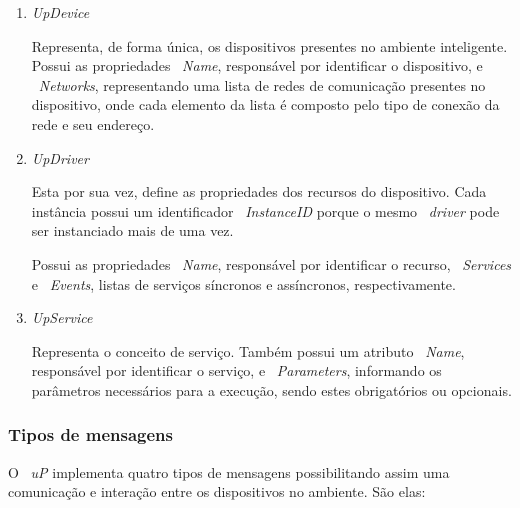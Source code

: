	\begin{enumerate}
	  \item \textit{UpDevice}

			Representa, de forma única, os dispositivos presentes no ambiente inteligente. Possui as
			propriedades ~\textit{Name}, responsável por identificar o dispositivo, e  ~\textit{Networks},
			representando uma lista de redes de comunicação presentes no dispositivo, onde cada elemento da
			lista é composto pelo tipo de conexão da rede e seu endereço.
	  
	  \item \textit{UpDriver}
	  		
	  		Esta por sua vez, define as propriedades dos recursos do dispositivo. Cada instância possui um
	  		identificador ~\textit{InstanceID} porque o mesmo ~\textit{driver} pode ser instanciado mais de
	  		uma vez.
			
			Possui as propriedades ~\textit{Name}, responsável por identificar o recurso, ~\textit{Services}
			e ~\textit{Events}, listas de serviços síncronos e assíncronos, respectivamente.
			  
	  \item \textit{UpService}
			
			Representa o conceito de serviço. Também possui um atributo ~\textit{Name}, responsável por
			identificar o serviço, e ~\textit{Parameters}, informando os parâmetros necessários para a
			execução, sendo estes obrigatórios ou opcionais.
	
	\end{enumerate}
	
	
	\subsubsection{Tipos de mensagens}
	
	O ~\textit{uP} implementa quatro tipos de mensagens possibilitando assim uma comunicação e
	interação entre os dispositivos no ambiente. São elas:
	
